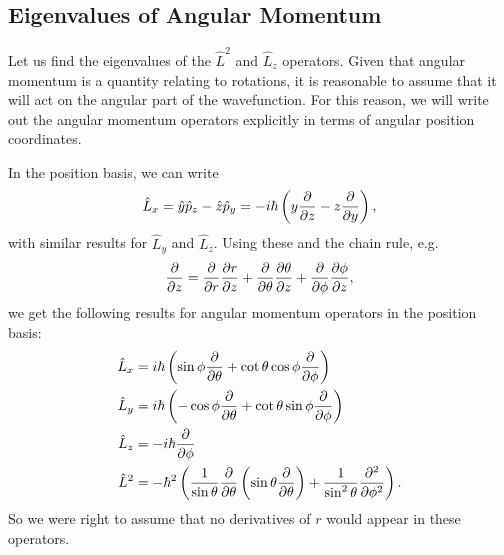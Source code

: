 \documentclass[../quantum_mechanics.tex]{subfiles}
\begin{document}
        \subsection{Eigenvalues of Angular Momentum}\label{sec:angular-momentum:subsec:eigenvalues}
            Let us find the eigenvalues of the $\hat{L}^2$ and $\hat{L}_z$ operators.
            Given that angular momentum is a quantity relating to rotations, it is reasonable to assume that it will act on the angular part of the wavefunction.
            For this reason, we will write out the angular momentum operators explicitly in terms of angular position coordinates.

            In the position basis, we can write
            \begin{equation}
                \hat{L}_x=\hat{y}\hat{p}_z-\hat{z}\hat{p}_y=-i\hbar\left(y\pdv{}{z}-z\pdv{}{y}\right),
            \end{equation}
            with similar results for $\hat{L}_y$ and $\hat{L}_z$.
            Using these and the chain rule, e.g.
            \begin{equation}
                \pdv{}{z}=\pdv{}{r}\pdv{r}{z}+\pdv{}{\theta}\pdv{\theta}{z}+\pdv{}{\phi}\pdv{\phi}{z},
            \end{equation}
            we get the following results for angular momentum operators in the position basis:
            \begin{align}
                \hat{L}_x&=i\hbar\left(\sin\phi\pdv{}{\theta}+\cot\theta\cos\phi\pdv{}{\phi}\right)\\
                \hat{L}_y&=i\hbar\left(-\cos\phi\pdv{}{\theta}+\cot\theta\sin\phi\pdv{}{\phi}\right)\\
                \hat{L}_z&=-i\hbar\pdv{}{\phi}\\
                \hat{L}^2&=-\hbar^2\left(\frac{1}{\sin\theta}\pdv{}{\theta}\left(\sin\theta\pdv{}{\theta}\right)+\frac{1}{\sin^2\theta}\pdv[2]{}{\phi}\right).\label{eq:angular-momentum-magnitude-position-basis}
            \end{align}
            So we were right to assume that no derivatives of $r$ would appear in these operators.
\end{document}

